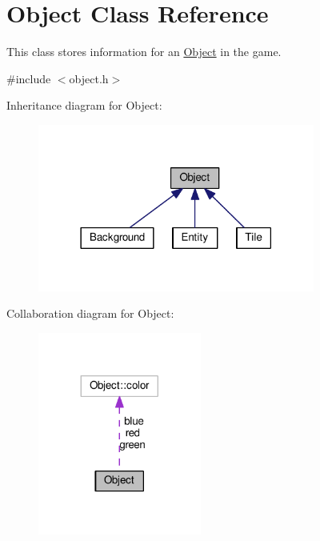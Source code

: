 \hypertarget{classObject}{}\section{Object Class Reference}
\label{classObject}


This class stores information for an \hyperlink{classObject}{Object} in the game.  




{\ttfamily \#include $<$object.\+h$>$}



Inheritance diagram for Object\+:\nopagebreak
\begin{figure}[H]
\begin{center}
\leavevmode
\includegraphics[width=258pt]{classObject__inherit__graph}
\end{center}
\end{figure}


Collaboration diagram for Object\+:
\nopagebreak
\begin{figure}[H]
\begin{center}
\leavevmode
\includegraphics[width=152pt]{classObject__coll__graph}
\end{center}
\end{figure}
